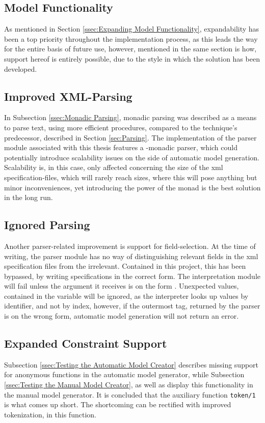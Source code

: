 \subsection{Model Functionality}
As mentioned in Section \ref{ssec:Expanding Model Functionality}, expandability has been a top priority throughout the implementation process, as this leads the way for the entire basis of future use, however,  mentioned in the same section is how, support hereof is entirely possible, due to the style in which the solution has been developed. 
\subsection{Improved XML-Parsing}
In Subsection \ref{ssec:Monadic Parsing}, monadic parsing was described as a means to parse text, using more efficient procedures, compared to the technique's predecessor, described in Section \ref{sec:Parsing}. The implementation of the parser module associated with this thesis features a -monadic parser, which could potentially introduce scalability issues on the side of automatic model generation. Scalability is, in this case, only affected concerning the size of the xml specification-files, which will rarely reach sizes, where this will pose anything but minor inconveniences, yet introducing the power of the monad is the best solution in the long run.
\subsection{Ignored Parsing}
Another parser-related improvement is support for field-selection. At the time of writing, the parser module has no way of distinguishing relevant fields in the xml specification files from the irrelevant. Contained in this project, this has been bypassed, by writing specifications in the correct form. The interpretation module will fail unless the argument it receives is on the form . Unexpected values, contained in the  variable will be ignored, as the interpreter looks up values by identifier, and not by index, however, if the outermost tag, returned by the parser is on the wrong form, automatic model generation will not return an error.
\subsection{Expanded Constraint Support}
Subsection \ref{ssec:Testing the Automatic Model Creator} describes missing support for anonymous functions in the automatic model generator, while Subsection \ref{ssec:Testing the Manual Model Creator}, as well as  display this functionality in the manual model generator. It is concluded that the auxiliary function \lstinline{token/1} is what comes up short. The shortcoming can be rectified with improved tokenization, in this function.\newpage
